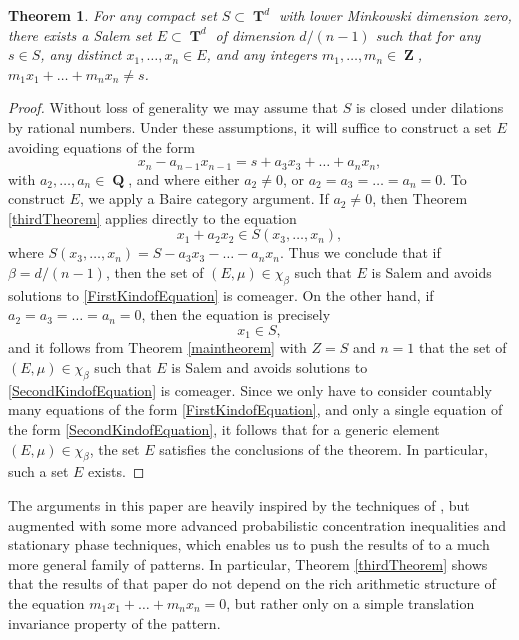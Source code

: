 \documentclass[dvipsnames,letterpaper,12pt]{article}
\numberwithin{equation}{section}
\DeclareMathOperator{\ZZ}{\mathbf{Z}}
\DeclareMathOperator{\QQ}{\mathbf{Q}}
\DeclareMathOperator{\TT}{\mathbf{T}}
\newtheorem{theorem}{Theorem}
\numberwithin{theorem}{section}
\begin{document}
\begin{theorem} \label{dDimensionalKornerResult}
    For any compact set $S \subset \TT^d$ with lower Minkowski dimension zero, there exists a Salem set $E \subset \TT^d$ of dimension $d/(n-1)$ such that for any $s \in S$, any distinct $x_1,\dots,x_n \in E$, and any integers $m_1,\dots,m_n \in \ZZ$, $m_1x_1 + \dots + m_nx_n \neq s$.
\end{theorem}
\begin{proof}
    Without loss of generality we may assume that $S$ is closed under dilations by rational numbers. Under these assumptions, it will suffice to construct a set $E$ avoiding equations of the form
    \[ x_n - a_{n-1} x_{n-1} = s + a_3x_3 + \dots + a_nx_n, \]
    with $a_2,\dots,a_n \in \QQ$, and where either $a_2 \neq 0$, or $a_2 = a_3 = \dots = a_n = 0$. To construct $E$, we apply a Baire category argument. If $a_2 \neq 0$, then Theorem \ref{thirdTheorem} applies directly to the equation
    \begin{equation} \label{FirstKindofEquation}
        x_1 + a_2 x_2 \in S(x_3,\dots,x_n),
    \end{equation}
    where $S(x_3,\dots,x_n) = S - a_3x_3 - \dots - a_nx_n$. Thus we conclude that if $\beta = d/(n-1)$, then the set of $(E,\mu) \in \chi_\beta$ such that $E$ is Salem and avoids solutions to \eqref{FirstKindofEquation} is comeager. On the other hand, if $a_2 = a_3 = \dots = a_n = 0$, then the equation is precisely
    \begin{equation} \label{SecondKindofEquation}
        x_1 \in S,
    \end{equation}
    and it follows from Theorem \ref{maintheorem} with $Z = S$ and $n = 1$ that the set of $(E,\mu) \in \chi_\beta$ such that $E$ is Salem and avoids solutions to \eqref{SecondKindofEquation} is comeager. Since we only have to consider countably many equations of the form \eqref{FirstKindofEquation}, and only a single equation of the form \eqref{SecondKindofEquation}, it follows that for a generic element $(E,\mu) \in \chi_\beta$, the set $E$ satisfies the conclusions of the theorem. In particular, such a set $E$ exists.
\end{proof}

The arguments in this paper are heavily inspired by the techniques of \cite{Korner2}, but augmented with some more advanced probabilistic concentration inequalities and stationary phase techniques, which enables us to push the results of \cite{Korner2} to a much more general family of patterns. In particular, Theorem \ref{thirdTheorem} shows that the results of that paper do not depend on the rich arithmetic structure of the equation $m_1x_1 + \dots + m_nx_n = 0$, but rather only on a simple translation invariance property of the pattern.
\end{document}
